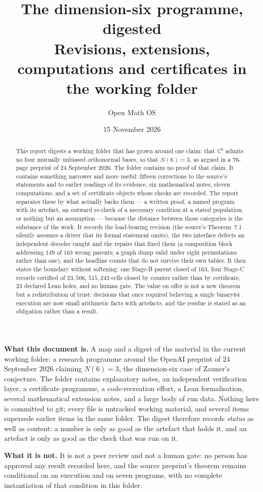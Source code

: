\documentclass[10pt]{article}
\title{\bfseries The dimension-six programme, digested\\[3pt]
\large Revisions, extensions, computations and certificates in the working folder}
\author{Open Math OS}
\date{15 November 2026}
\theoremstyle{definition}
\newcommand{\C}{\mathbb{C}}
\begin{document}
\maketitle
\begin{abstract}
\noindent
This report digests a working folder that has grown around one claim: that $\C^6$ admits no four mutually
unbiased orthonormal bases, so that $N(6)=3$, as argued in a $76$-page preprint of 24 September 2026. The
folder contains no proof of that claim. It contains something narrower and more useful: fifteen corrections
to the source's statements and to earlier readings of its evidence, six mathematical notes, eleven
computations, and a set of certificate objects whose checks are recorded. The report separates these by
what actually backs them --- a written proof, a named program with its artefact, an outward re-check of a
necessary condition at a stated population, or nothing but an assumption --- because the distance between
those categories is the substance of the work. It records the load-bearing revision (the source's
Theorem~7.1 silently assumes a driver that its formal statement omits), the two interface defects an
independent decoder caught and the repairs that fixed them (a composition block addressing $149$ of $163$
wrong parents; a graph dump valid under eight permutations rather than one), and the headline counts that
do not survive their own tables. It then states the boundary without softening: one Stage-B parent closed
of $163$, four Stage-C records certified of $23{,}506$, $515{,}243$ cells closed by counter rather than by
certificate, $23$ declared Lean holes, and no human gate. The value on offer is not a new theorem but a
redistribution of trust: decisions that once required believing a single binary64 execution are now small
arithmetic facts with artefacts, and the residue is stated as an obligation rather than a result.
\end{abstract}


\begin{tcolorbox}[colback=blue!3,colframe=blue!40!black,boxrule=.6pt,arc=2pt,left=6pt,right=6pt,top=4pt,bottom=4pt]
\textbf{What this document is.} A map and a digest of the material in the current working folder:
a research programme around the OpenAI preprint of 24 September 2026 claiming $N(6)=3$, the
dimension-six case of Zauner's conjecture. The folder contains explanatory notes, an independent
verification layer, a certificate programme, a code-recreation effort, a Lean formalisation, several
mathematical extension notes, and a large body of run data. Nothing here is committed to git; every
file is untracked working material, and several items supersede earlier items in the same folder.
The digest therefore records \emph{status} as well as content: a number is only as good as the
artefact that holds it, and an artefact is only as good as the check that was run on it.

\textbf{What it is not.} It is not a peer review and not a human gate: no person has approved any result
recorded here, and the source preprint's theorem remains conditional on an execution and on seven
programs, with no complete instantiation of that condition in this folder.
\end{tcolorbox}
\end{document}

